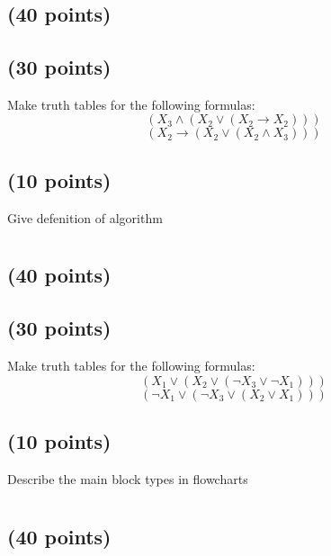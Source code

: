 \documentclass[a4paper,10pt]{article}
\begin{document}
\section{}
\subsection{(40 points)}


\subsection{(30 points)}
 Make truth tables for the following formulas:
\[
(X_{3} \wedge (X_{2} \vee (X_{2} \rightarrow X_{2})))
\]
\[
(X_{2} \rightarrow (X_{2} \vee (X_{2} \wedge X_{3})))
\]

\subsection{(10 points)}
Give defenition of algorithm

\newpage

\section{}
\subsection{(40 points)}


\subsection{(30 points)}
 Make truth tables for the following formulas:
\[
(X_{1} \vee (X_{2} \vee (\neg X_{3} \vee \neg X_{1})))
\]
\[
(\neg X_{1} \vee (\neg X_{3} \vee (X_{2} \vee X_{1})))
\]

\subsection{(10 points)}
Describe the main block types in flowcharts

\newpage

\section{}
\subsection{(40 points)}

\end{document}
